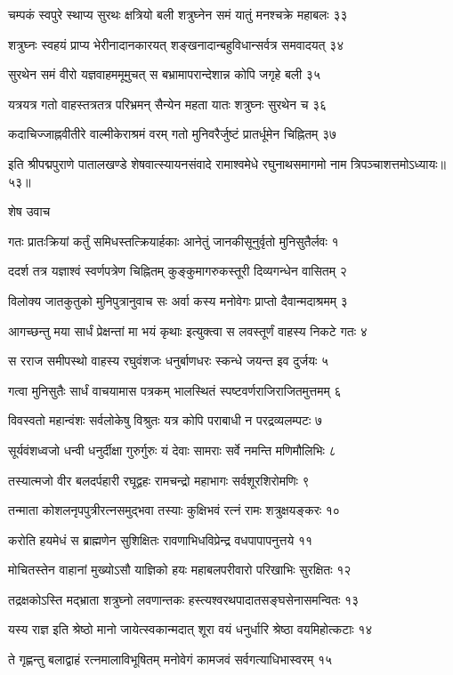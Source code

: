 चम्पकं स्वपुरे स्थाप्य सुरथः क्षत्रियो बली
शत्रुघ्नेन समं यातुं मनश्चक्रे महाबलः ३३

शत्रुघ्नः स्वहयं प्राप्य भेरीनादानकारयत्
शङ्खनादान्बहुविधान्सर्वत्र समवादयत् ३४

सुरथेन समं वीरो यज्ञवाहममूमुचत्
स बभ्रामापरान्देशान्न कोपि जगृहे बली ३५

यत्रयत्र गतो वाहस्तत्रतत्र परिभ्रमन्
सैन्येन महता यातः शत्रुघ्नः सुरथेन च ३६

कदाचिज्जाह्नवीतीरे वाल्मीकेराश्रमं वरम्
गतो मुनिवरैर्जुष्टं प्रातर्धूमेन चिह्नितम् ३७

इति श्रीपद्मपुराणे पातालखण्डे शेषवात्स्यायनसंवादे रामाश्वमेधे रघुनाथसमागमो नाम त्रिपञ्चाशत्तमोऽध्यायः॥५३॥


शेष उवाच

गतः प्रातःक्रियां कर्तुं समिधस्तत्क्रियार्हकाः
आनेतुं जानकीसूनुर्वृतो मुनिसुतैर्लवः १

ददर्श तत्र यज्ञाश्वं स्वर्णपत्रेण चिह्नितम्
कुङ्कुमागरुकस्तूरी दिव्यगन्धेन वासितम् २

विलोक्य जातकुतुको मुनिपुत्रानुवाच सः
अर्वा कस्य मनोवेगः प्राप्तो दैवान्मदाश्रमम् ३

आगच्छन्तु मया सार्धं प्रेक्षन्तां मा भयं कृथाः
इत्युक्त्वा स लवस्तूर्णं वाहस्य निकटे गतः ४

स रराज समीपस्थो वाहस्य रघुवंशजः
धनुर्बाणधरः स्कन्धे जयन्त इव दुर्जयः ५

गत्वा मुनिसुतैः सार्धं वाचयामास पत्रकम्
भालस्थितं स्पष्टवर्णराजिराजितमुत्तमम् ६

विवस्वतो महान्वंशः सर्वलोकेषु विश्रुतः
यत्र कोपि पराबाधी न परद्रव्यलम्पटः ७

सूर्यवंशध्वजो धन्वी धनुर्दीक्षा गुरुर्गुरुः
यं देवाः सामराः सर्वे नमन्ति मणिमौलिभिः ८

तस्यात्मजो वीर बलदर्पहारी रघूद्वहः
रामचन्द्रो महाभागः सर्वशूरशिरोमणिः ९

तन्माता कोशलनृपपुत्रीरत्नसमुद्भवा
तस्याः कुक्षिभवं रत्नं रामः शत्रुक्षयङ्करः १०

करोति हयमेधं स ब्राह्मणेन सुशिक्षितः
रावणाभिधविप्रेन्द्र वधपापापनुत्तये ११

मोचितस्तेन वाहानां मुख्योऽसौ याज्ञिको हयः
महाबलपरीवारो परिखाभिः सुरक्षितः १२

तद्रक्षकोऽस्ति मद्भ्राता शत्रुघ्नो लवणान्तकः
हस्त्यश्वरथपादातसङ्घसेनासमन्वितः १३

यस्य राज्ञ इति श्रेष्ठो मानो जायेत्स्वकान्मदात्
शूरा वयं धनुर्धारि श्रेष्ठा वयमिहोत्कटाः १४

ते गृह्णन्तु बलाद्वाहं रत्नमालाविभूषितम्
मनोवेगं कामजवं सर्वगत्याधिभास्वरम् १५

